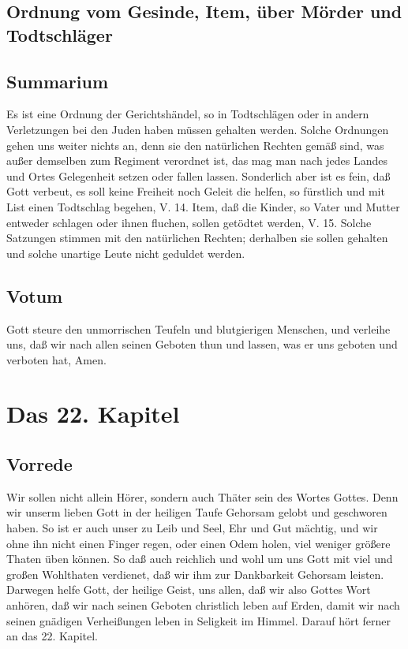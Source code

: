 \section{Ordnung vom Gesinde, Item, über Mörder und Todtschläger}

\section{Summarium}

Es ist eine Ordnung der Gerichtshändel, so in Todtschlägen oder in andern Verletzungen bei den Juden haben müssen gehalten werden. Solche Ordnungen gehen uns weiter nichts an, denn sie den natürlichen Rechten gemäß sind, was außer demselben zum Regiment verordnet ist, das mag man nach jedes Landes und Ortes Gelegenheit setzen oder fallen lassen. Sonderlich aber ist es fein, daß Gott verbeut, es soll keine Freiheit noch Geleit die helfen, so fürstlich und mit List einen Todtschlag begehen, V. 14. Item, daß die Kinder, so Vater und Mutter entweder schlagen oder ihnen fluchen, sollen getödtet werden, V. 15. Solche Satzungen stimmen mit den natürlichen Rechten; derhalben sie sollen gehalten und solche unartige Leute nicht geduldet werden.

\section{Votum}

Gott steure den unmorrischen Teufeln und blutgierigen Menschen, und verleihe uns, daß wir nach allen seinen Geboten thun und lassen, was er uns geboten und verboten hat, Amen.

\chapter{Das 22. Kapitel}

\section{Vorrede}

Wir sollen nicht allein Hörer, sondern auch Thäter sein des Wortes Gottes. Denn wir unserm lieben Gott in der heiligen Taufe Gehorsam gelobt und geschworen haben. So ist er auch unser zu Leib und Seel, Ehr und Gut mächtig, und wir ohne ihn nicht einen Finger regen, oder einen Odem holen, viel weniger größere Thaten üben können. So daß auch reichlich und wohl um uns Gott mit viel und großen Wohlthaten verdienet, daß wir ihm zur Dankbarkeit Gehorsam leisten. Darwegen helfe Gott, der heilige Geist, uns allen, daß wir also Gottes Wort anhören, daß wir nach seinen Geboten christlich leben auf Erden, damit wir nach seinen gnädigen Verheißungen leben in Seligkeit im Himmel. Darauf hört ferner an das 22. Kapitel.

